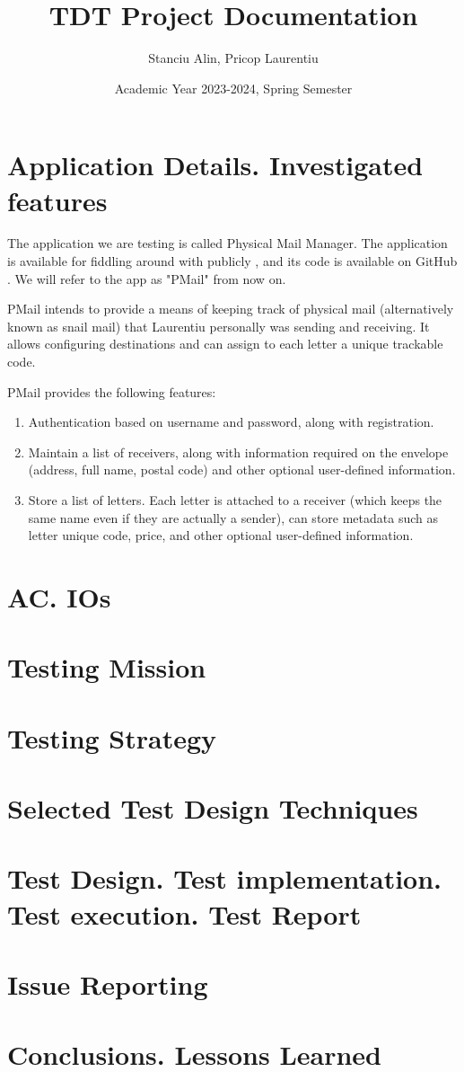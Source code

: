 \documentclass{article}
\title{TDT Project Documentation}
\author{Stanciu Alin, Pricop Laurentiu}
\date{Academic Year 2023-2024, Spring Semester}
\begin{document}

\maketitle
\tableofcontents

\newpage
{}

\section{Application Details. Investigated features}

The application we are testing is called Physical Mail Manager. The application is available for fiddling around with publicly \cite{PmailSite}, and its code is available on GitHub \cite{PmailGithub}. We will refer to the app as "PMail" from now on.

PMail intends to provide a means of keeping track of physical mail (alternatively known as snail mail) that Laurentiu personally was sending and receiving. It allows configuring destinations and can assign to each letter a unique trackable code.

PMail provides the following features:
\begin{enumerate}
    \item Authentication based on username and password, along with registration.
    \item Maintain a list of receivers, along with information required on the envelope (address, full name, postal code) and other optional user-defined information.
    \item Store a list of letters. Each letter is attached to a receiver (which keeps the same name even if they are actually a sender), can store metadata such as letter unique code, price, and other optional user-defined information.
\end{enumerate}

\section{AC. IOs}

\section{Testing Mission}

\section{Testing Strategy}

\section{Selected Test Design Techniques}

\section{Test Design. Test implementation. Test execution. Test Report}

\section{Issue Reporting}

\section{Conclusions. Lessons Learned}

\newpage

\end{document}
